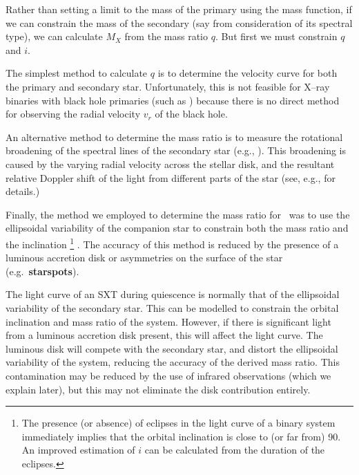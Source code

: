 Rather than setting a limit to the mass of the primary using the mass
function, if we can constrain the mass of the secondary (say from
consideration of its spectral type), we can calculate $M_{X}$ from the
mass ratio $q$. But first we must constrain $q$ and $i$. %

\vspace{\myparskip}

The simplest method to calculate $q$ is to determine the velocity
curve for both the primary and secondary star. Unfortunately, this is
not feasible for X--ray binaries with black hole primaries (such as \groj) because there is no direct method for observing the radial velocity $v_r$ of the black hole. %

\vspace{\myparskip}

An alternative method to determine the mass ratio is to measure the rotational broadening of the spectral lines of the secondary star (e.g., %
%
). This broadening is caused by the varying radial velocity across the
stellar disk, and the resultant relative Doppler shift of the light
from different parts of the star (see, e.g., %
for details.) %

\vspace{\myparskip}

Finally, the method we employed to determine the mass ratio for \groj\ was to use the ellipsoidal variability of the companion star to constrain
both the mass ratio and the inclination%
\footnote{
\label{cha:Introduction:sec:X--rayBinaries:subsec:DeterminingTheMassOfThePrimary:foot:inc}
The presence (or absence) of eclipses in the light curve of a binary system
immediately implies that the orbital inclination is close to (or far from) 90\degr. An improved estimation of $i$ can be calculated from the
duration of the eclipses. %
}%
. The accuracy of this method is
reduced by the presence of a luminous accretion disk or asymmetries on the surface of the star
(e.g.\ \textbf{starspots}). %

\vspace{\myparskip}

The light curve of an SXT during quiescence is normally that of the ellipsoidal variability of the secondary star. This can be modelled to constrain the orbital inclination and mass ratio of the system. However, if there is significant light from a luminous accretion disk
present, this will affect the light curve. The luminous disk will compete with the secondary star, and distort the ellipsoidal variability of the system, reducing the accuracy of the derived mass ratio. This contamination may be reduced by the use of infrared observations (which we explain later), but this may not eliminate the disk contribution entirely.

